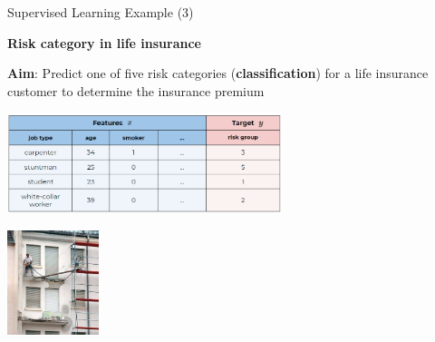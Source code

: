 \documentclass[11pt,compress,t,notes=noshow, xcolor=table]{beamer}
\begin{document}
\begin{vbframe}{Supervised Learning Example (3)}

\textbf{Risk category in life insurance}

  \textbf{Aim}: Predict one of five risk categories (\textbf{classification}) for a life insurance customer to determine the insurance premium 
\begin{center}

    \includegraphics[width=0.6\textwidth]{figure_man/ml-basics-supervised-task-insurance-data.png} 

\lz

  \includegraphics[width = 0.2\textwidth]{figure_man/classif_ex_placeholder.jpg} 
\end{center}

\end{vbframe}




% 
% 
%   
%   
% 
%   
% 
\end{document}
